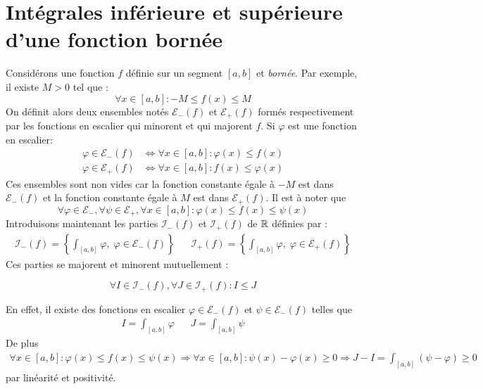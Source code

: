\section{Intégrales inférieure et supérieure d'une fonction bornée}
Considérons une fonction $f$ définie sur un segment $[a,b]$ et \emph{bornée}. Par exemple, il existe $M>0$ tel que :
\begin{displaymath}
 \forall x\in [a,b] : -M\leq f(x) \leq M
\end{displaymath}
On définit alors deux ensembles notés $\mathcal E_-(f)$ et $\mathcal E_+(f)$ formés respectivement par les fonctions en escalier qui minorent et qui majorent $f$. Si $\varphi$ est une fonction en escalier:
\begin{align*}
 \varphi \in \mathcal E_-(f) &\Leftrightarrow \forall x\in [a,b] : \varphi(x) \leq f(x) \\
 \varphi \in \mathcal E_+(f) &\Leftrightarrow \forall x\in [a,b] :  f(x) \leq \varphi(x)
\end{align*}
Ces ensembles sont non vides car la fonction constante égale à $-M$ est dans $\mathcal E_-(f)$ et la fonction constante égale à $M$ est dans $\mathcal E_+(f)$. Il est à noter que
\begin{displaymath}
 \forall \varphi\in \mathcal E_- , \forall \psi\in \mathcal E_+, \forall x\in[a,b] :
\varphi(x) \leq f(x) \leq \psi(x)
\end{displaymath}
Introduisons maintenant les parties $\mathcal I_-(f)$ et $\mathcal I_+(f)$ de $\mathbb{R}$ définies par :
\begin{align*}
 \mathcal I_-(f) = \left\lbrace \int_{[a,b]}\varphi , \; \varphi \in \mathcal E_-(f)\right\rbrace  & &
 \mathcal I_+(f) = \left\lbrace \int_{[a,b]}\varphi , \; \varphi \in \mathcal E_+(f)\right\rbrace
\end{align*}
Ces parties se majorent et minorent mutuellement :
\begin{propn}
\begin{displaymath}
 \forall I\in \mathcal I_-(f), \forall J\in \mathcal I_+(f) : I\leq J
\end{displaymath}
\end{propn}
\begin{demo}
 En effet, il existe des fonctions en escalier $\varphi\in\mathcal E_-(f)$ et  $\psi\in\mathcal E_-(f)$ telles que 
\begin{align*}
 I= \int_{[a,b]}\varphi & & J= \int_{[a,b]}\psi
\end{align*}
De plus 
\begin{multline*}
 \forall x\in[a,b] : \varphi(x) \leq f(x) \leq \psi(x) \Rightarrow \forall x\in[a,b] : \psi(x)-\varphi(x)\geq 0 
\Rightarrow J-I = \int_{[a,b]}(\psi -\varphi)\geq 0
\end{multline*}
par linéarité et positivité.
\end{demo}
